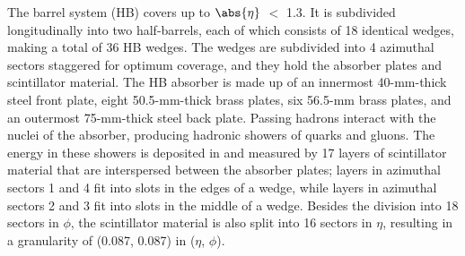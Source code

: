 The barrel system (HB) covers up to $\abs{\eta}$ $<$ 1.3. It is subdivided longitudinally into two half-barrels, each of which consists of 18 identical wedges, making a total of 36 HB wedges. The wedges are subdivided into 4 azimuthal sectors staggered for optimum coverage, and they hold the absorber plates and scintillator material. The HB absorber is made up of an innermost 40-mm-thick steel front plate, eight 50.5-mm-thick brass plates, six 56.5-mm brass plates, and an outermost 75-mm-thick steel back plate. Passing hadrons interact with the nuclei of the absorber, producing hadronic showers of quarks and gluons. The energy in these showers is deposited in and measured by 17 layers of scintillator material that are interspersed between the absorber plates; layers in azimuthal sectors 1 and 4 fit into slots in the edges of a wedge, while layers in azimuthal sectors 2 and 3 fit into slots in the middle of a wedge. Besides the division into 18 sectors in $\phi$, the scintillator material is also split into 16 sectors in $\eta$, resulting in a granularity of (0.087, 0.087) in ($\eta$, $\phi$).

